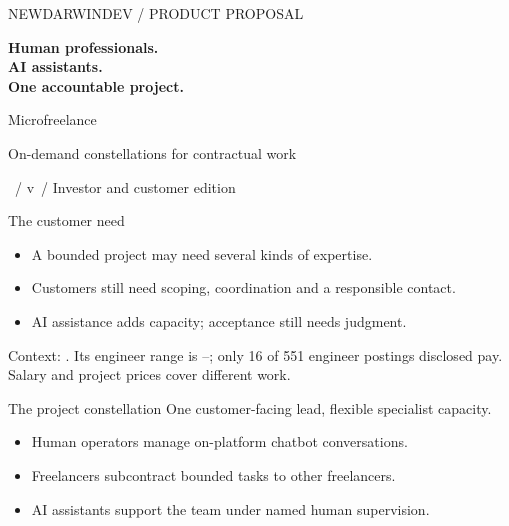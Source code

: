 \documentclass[aspectratio=169,20pt]{beamer}
\newcommand{\Sources}[1]{\par\vfill{\fontsize{14}{18}\selectfont\color{gray}#1\par}}
\begin{document}
\begin{frame}[plain]
{\small\color{accent}NEWDARWINDEV / PRODUCT PROPOSAL}\par\vspace{7mm}
{\fontsize{54}{62}\selectfont\bfseries Human professionals.\\AI assistants.\\One accountable project.}\par\vspace{6mm}
{\fontsize{30}{38}\selectfont Microfreelance}\par
{\small On-demand constellations for contractual work}\par\vspace{5mm}
{\scriptsize \DocDate\ / v\DocVersion\ / Investor and customer edition}
\end{frame}
\begin{frame}{The customer need}
\begin{itemize}
\item A bounded project may need several kinds of expertise.
\item Customers still need scoping, coordination and a responsible contact.
\item AI assistance adds capacity; acceptance still needs judgment.
\end{itemize}
\Sources{Context: \SourceLink. Its engineer range is \Money{120,000}--\Money{165,000}; only 16 of 551 engineer postings disclosed pay. Salary and project prices cover different work.}
\end{frame}
\begin{frame}{The project constellation}
{\fontsize{30}{38}\selectfont One customer-facing lead, flexible specialist capacity.}\par\vspace{5mm}
\begin{itemize}
\item Human operators manage on-platform chatbot conversations.
\item Freelancers subcontract bounded tasks to other freelancers.
\item AI assistants support the team under named human supervision.
\end{itemize}
\end{frame}
\end{document}
